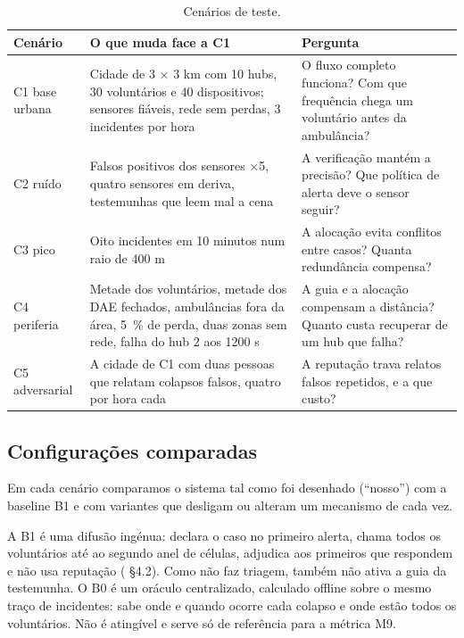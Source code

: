 \documentclass[11pt,a4paper]{article}
\begin{document}
\begin{table}[htbp]
\centering
\small
\caption{Cenários de teste.}\label{tab:cenarios}
\begin{tabularx}{\textwidth}{P{2.2cm}LL}
\toprule
Cenário & O que muda face a C1 & Pergunta \\
\midrule
C1 base urbana & Cidade de 3 $\times$ 3 km com 10 hubs, 30 voluntários e 40 dispositivos; sensores fiáveis, rede sem perdas, 3 incidentes por hora & O fluxo completo funciona? Com que frequência chega um voluntário antes da ambulância? \\
C2 ruído & Falsos positivos dos sensores $\times$5, quatro sensores em deriva, testemunhas que leem mal a cena & A verificação mantém a precisão? Que política de alerta deve o sensor seguir? \\
C3 pico & Oito incidentes em 10 minutos num raio de 400 m & A alocação evita conflitos entre casos? Quanta redundância compensa? \\
C4 periferia & Metade dos voluntários, metade dos DAE fechados, ambulâncias fora da área, 5~\% de perda, duas zonas sem rede, falha do hub 2 aos 1200 s & A guia e a alocação compensam a distância? Quanto custa recuperar de um hub que falha? \\
C5 adversarial & A cidade de C1 com duas pessoas que relatam colapsos falsos, quatro por hora cada & A reputação trava relatos falsos repetidos, e a que custo? \\
\bottomrule
\end{tabularx}
\end{table}

\subsection{Configurações comparadas}

Em cada cenário comparamos o sistema tal como foi desenhado (``nosso'') com a baseline B1 e com variantes que desligam ou alteram um mecanismo de cada vez.

A B1 é uma difusão ingénua: declara o caso no primeiro alerta, chama todos os voluntários até ao segundo anel de células, adjudica aos primeiros que respondem e não usa reputação ( §4.2). Como não faz triagem, também não ativa a guia da testemunha. O B0 é um oráculo centralizado, calculado offline sobre o mesmo traço de incidentes: sabe onde e quando ocorre cada colapso e onde estão todos os voluntários. Não é atingível e serve só de referência para a métrica M9.
\end{document}
